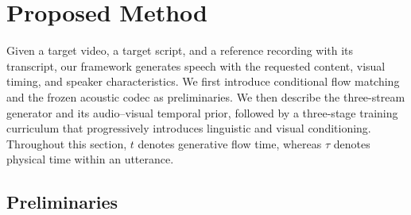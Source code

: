 \section{Proposed Method}
\label{sec:method}

Given a target video, a target script, and a reference recording with its transcript, our framework generates speech with the requested content, visual timing, and speaker characteristics. We first introduce conditional flow matching and the frozen acoustic codec as preliminaries. We then describe the three-stream generator and its audio--visual temporal prior, followed by a three-stage training curriculum that progressively introduces linguistic and visual conditioning. Throughout this section, $t$ denotes generative flow time, whereas $\tau$ denotes physical time within an utterance.

\subsection{Preliminaries}
\label{sec:preliminaries}
\label{sec:flow_preliminaries}
\label{subsec:audio_compression}
\label{sec:audio_compression}












